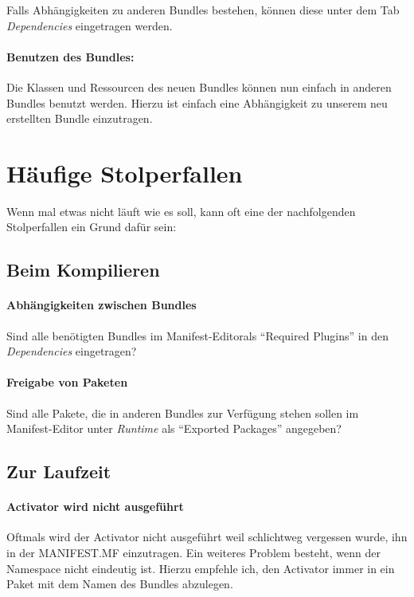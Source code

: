 \documentclass[10pt,a4paper]{scrartcl}
\begin{document}
Falls Abhängigkeiten zu anderen Bundles bestehen, können diese unter dem Tab
\emph{Dependencies} eingetragen werden.

\paragraph{Benutzen des Bundles:}
Die Klassen und Ressourcen des neuen Bundles können nun einfach in anderen
Bundles benutzt werden. Hierzu ist einfach eine Abhängigkeit zu unserem neu
erstellten Bundle einzutragen.



\clearpage
\section{Häufige Stolperfallen}

Wenn mal etwas nicht läuft wie es soll, kann oft eine der nachfolgenden
Stolperfallen ein Grund dafür sein:

\subsection{Beim Kompilieren}

\paragraph{Abhängigkeiten zwischen Bundles} Sind alle benötigten Bundles im
Manifest-Editorals ``Required Plugins'' in den \emph{Dependencies} eingetragen?

\paragraph{Freigabe von Paketen} Sind alle Pakete, die in anderen Bundles zur
Verfügung stehen sollen im Manifest-Editor unter \emph{Runtime} als ``Exported
Packages'' angegeben?

\subsection{Zur Laufzeit}
\paragraph{Activator wird nicht ausgeführt} Oftmals wird der Activator nicht 
ausgeführt weil schlichtweg vergessen wurde, ihn in der MANIFEST.MF einzutragen.
Ein weiteres Problem besteht, wenn der Namespace nicht eindeutig ist. Hierzu 
empfehle ich, den Activator immer in ein Paket mit dem Namen des Bundles 
abzulegen.
\end{document}
